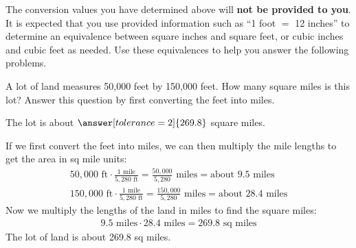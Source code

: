 \documentclass[12pt]{ximera}
\begin{document}
The conversion values you have determined above will \textbf{not be provided to you}.
It is expected that you use provided information such as ``1 foot $=$ 12 inches'' to
determine an equivalence between square inches and square feet, or cubic inches and
cubic feet as needed. Use these equivalences to help you answer the following problems.

\begin{problem}
A lot of land measures 50,000 feet by 150,000 feet. How many square miles is this lot?
Answer this question by first converting the feet into miles.

The lot is about $\answer[tolerance=2]{269.8}$ square miles.

\begin{freeResponse}
\end{freeResponse}

\begin{solution}
If we first convert the feet into miles, we can then multiply the mile lengths to get
the area in sq mile units:
\begin{gather*}
50{,}000\text{ ft} \cdot \frac{1\text{ mile}}{5{,}280\text{ ft}} = \frac{50{,}000}{5{,}280}\text{ miles} = \text{about } 9.5\text{ miles} \\
150{,}000\text{ ft} \cdot \frac{1\text{ mile}}{5{,}280\text{ ft}} = \frac{150{,}000}{5{,}280}\text{ miles} = \text{about } 28.4\text{ miles}
\end{gather*}
Now we multiply the lengths of the land in miles to find the square miles:
\begin{gather*}
9.5\text{ miles} \cdot 28.4\text{ miles} = 269.8\text{ sq miles}
\end{gather*}
The lot of land is about 269.8 sq miles.
\end{solution}
\end{problem}
\end{document}
